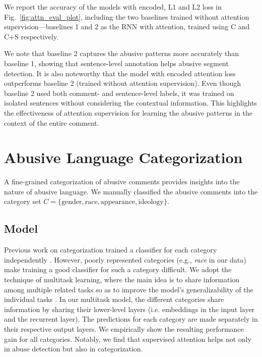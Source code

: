 \documentclass[letterpaper]{article} %
\begin{document}
We report the accuracy of the models with encoded, L1 and L2 loss in Fig.~\ref{fig:attn_eval_plot}, including the two baselines trained without attention supervision---baselines 1 and 2 as   the RNN with attention, trained using C and C+S respectively.


We note that  baseline 2 captures the abusive patterns more accurately than baseline 1, showing that sentence-level annotation helps abusive segment detection. It is also noteworthy that the model with encoded attention loss outperforms baseline 2 (trained without attention supervision). Even though baseline 2 used both comment- and sentence-level labels, it was trained on isolated sentences without considering the contextual information. This highlights the effectiveness of attention supervision for learning the abusive patterns  in the context of the entire comment.



\section{Abusive Language Categorization}
\label{sec:categorization}

A fine-grained categorization of abusive comments provides insights into the nature of  abusive language.
We  manually classified the abusive comments into the category set $C=\{\text{gender}, \text{race}, \text{appearance}, \text{ideology}\}$.


\subsection{Model}
Previous work on categorization trained a classifier for each category independently \cite{van2015detection,dinakar2011modeling}.
However, poorly represented categories (e.g., \textit{race} in our data) make  training a good classifier for such a category  difficult. We adopt the technique of multitask learning, where the main idea is to share information among multiple related tasks so as to improve the model's  generalizability  of the individual tasks \cite{standley2020tasks}. In our multitask model, the different categories share information by sharing their lower-level layers (i.e. embeddings in the input layer and the recurrent layer).
The predictions for each category are made separately in their respective output layers. We empirically show the resulting performance gain for all categories. Notably, we find that supervised attention helps not only in abuse detection but also in categorization.
\end{document}
